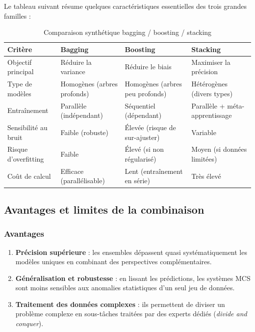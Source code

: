 Le tableau suivant résume quelques caractéristiques essentielles des trois grandes familles :

\begin{table}[h]
  \centering
  \caption{Comparaison synthétique bagging / boosting / stacking}
  \begin{tabularx}{\textwidth}{lXlX}
    \toprule
    Critère & Bagging & Boosting & Stacking \\
    \midrule
    Objectif principal
      & Réduire la variance
      & Réduire le biais
      & Maximiser la précision \\
    Type de modèles
      & Homogènes (arbres profonds)
      & Homogènes (arbres peu profonds)
      & Hétérogènes (divers types) \\
    Entraînement
      & Parallèle (indépendant)
      & Séquentiel (dépendant)
      & Parallèle + méta-apprentissage \\
    Sensibilité au bruit
      & Faible (robuste)
      & Élevée (risque de sur-ajuster)
      & Variable \\
    Risque d'overfitting
      & Faible
      & Élevé (si non régularisé)
      & Moyen (si données limitées) \\
    Coût de calcul
      & Efficace (parallélisable)
      & Lent (entraînement en série)
      & Très élevé \\
    \bottomrule
  \end{tabularx}
\end{table}


\subsection{Avantages et limites de la combinaison}

\subsubsection{Avantages}

\begin{enumerate}
  \item \textbf{Précision supérieure} : les ensembles dépassent quasi systématiquement les modèles
  uniques en combinant des perspectives complémentaires.

  \item \textbf{Généralisation et robustesse} : en lissant les prédictions, les systèmes MCS sont moins
  sensibles aux anomalies statistiques d'un seul jeu de données.

  \item \textbf{Traitement des données complexes} : ils permettent de diviser un problème complexe
  en sous-tâches traitées par des experts dédiés (\emph{divide and conquer}).
\end{enumerate}

